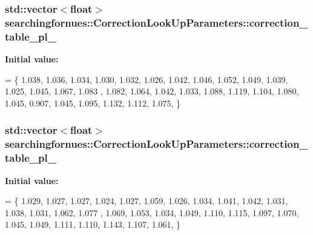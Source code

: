 \subsubsection[{\texorpdfstring{correction\+\_\+table\+\_\+pl\+\_\+0}{correction_table_pl_0}}]{\setlength{\rightskip}{0pt plus 5cm}std\+::vector$<$float$>$ searchingfornues\+::\+Correction\+Look\+Up\+Parameters\+::correction\+\_\+table\+\_\+pl\+\_}\hypertarget{structsearchingfornues_1_1CorrectionLookUpParameters_a36b2ccdf7ed5b2d952dfdeee0ab201bc}{}\label{structsearchingfornues_1_1CorrectionLookUpParameters_a36b2ccdf7ed5b2d952dfdeee0ab201bc}
{\bfseries Initial value\+:}
\begin{DoxyCode}
= \{
    1.038, 1.036, 1.034, 1.030, 1.032, 1.026, 1.042, 1.046, 1.052, 1.049, 1.039, 1.025, 1.045, 1.067, 1.083
      , 1.082, 1.064, 1.042, 1.033, 1.088,
    1.119, 1.104, 1.080, 1.045, 0.907, 1.045, 1.095, 1.132, 1.112, 1.075,
    \}
\end{DoxyCode}
\subsubsection[{\texorpdfstring{correction\+\_\+table\+\_\+pl\+\_\+1}{correction_table_pl_1}}]{\setlength{\rightskip}{0pt plus 5cm}std\+::vector$<$float$>$ searchingfornues\+::\+Correction\+Look\+Up\+Parameters\+::correction\+\_\+table\+\_\+pl\+\_}\hypertarget{structsearchingfornues_1_1CorrectionLookUpParameters_ad918a3ae6db6714811923e277631618f}{}\label{structsearchingfornues_1_1CorrectionLookUpParameters_ad918a3ae6db6714811923e277631618f}
{\bfseries Initial value\+:}
\begin{DoxyCode}
= \{
    1.029, 1.027, 1.027, 1.024, 1.027, 1.059, 1.026, 1.034, 1.041, 1.042, 1.031, 1.038, 1.031, 1.062, 1.077
      , 1.069, 1.053, 1.034, 1.049, 1.110,
    1.115, 1.097, 1.070, 1.045, 1.049, 1.111, 1.110, 1.143, 1.107, 1.061,
    \}
\end{DoxyCode}
